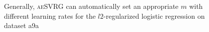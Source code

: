 \documentclass[conference]{IEEEtran}
\begin{document}
\begin{figure}[ht]
\centering
{}

\caption{Generally, \textsc{aeSVRG} can automatically set an appropriate $m$ with different learning rates for the $l2$-regularized logistic regression on dataset a9a}
\label{figure_logistic_a9a}
\end{figure}
\end{document}
